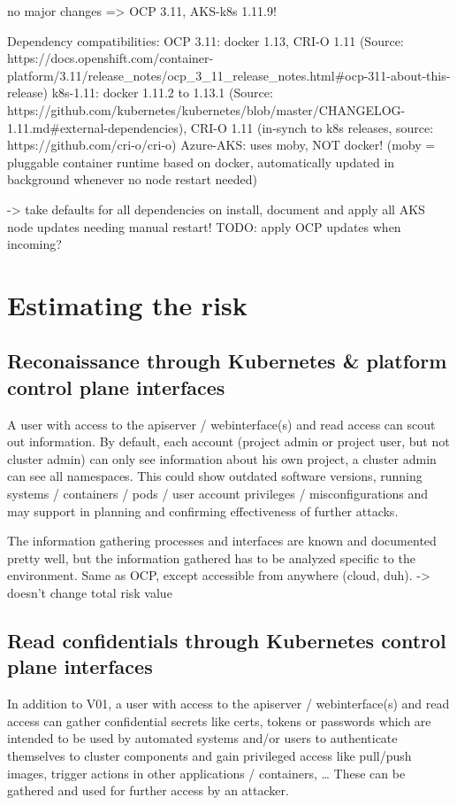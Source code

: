 no major changes => OCP 3.11, AKS-k8s 1.11.9!

Dependency compatibilities:
OCP 3.11: docker 1.13, CRI-O 1.11 (Source: https://docs.openshift.com/container-platform/3.11/release_notes/ocp_3_11_release_notes.html#ocp-311-about-this-release)
k8s-1.11: docker 1.11.2 to 1.13.1  (Source: https://github.com/kubernetes/kubernetes/blob/master/CHANGELOG-1.11.md#external-dependencies), CRI-O 1.11 (in-synch to k8s releases, source: https://github.com/cri-o/cri-o)
Azure-AKS: uses moby, NOT docker! (moby = pluggable container runtime based on docker, automatically updated in background whenever no node restart needed)

-> take defaults for all dependencies on install, document and apply all AKS node updates needing manual restart!
TODO: apply OCP updates when incoming?


\section{Estimating the risk}

\subsection{Reconaissance through Kubernetes & platform control plane interfaces}

A user with access to the apiserver / webinterface(s) and read access can scout out information.
By default, each account (project admin or project user, but not cluster admin) can only see information about his own project, a cluster admin can see all namespaces.
This could show outdated software versions, running systems / containers / pods / user account privileges / misconfigurations and may support in planning and confirming effectiveness of further attacks.

The information gathering processes and interfaces are known and documented pretty well, but the information gathered has to be analyzed specific to the environment.
Same as OCP, except accessible from anywhere (cloud, duh).
-> doesn’t change total risk value

\subsection{Read confidentials through Kubernetes control plane interfaces}
In addition to V01, a user with access to the apiserver / webinterface(s) and read access can gather confidential secrets like certs, tokens or passwords which are intended to be used by automated systems and/or users to authenticate themselves to cluster components and gain privileged access like pull/push images, trigger actions in other applications / containers, …
These can be gathered and used for further access by an attacker.

